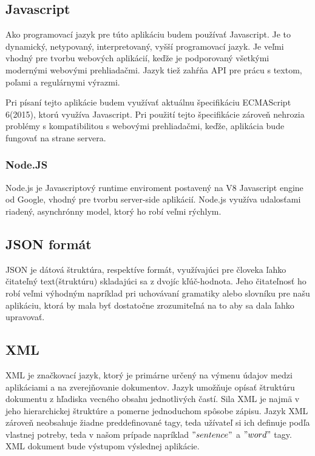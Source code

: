 \documentclass[12pt,a4paper]{report}
\theoremstyle{definition}
\theoremstyle{remark}
\begin{document}
\subsection{Javascript}
Ako programovací jazyk pre túto aplikáciu budem používať Javascript. Je to dynamický, netypovaný, interpretovaný, vyšší programovací jazyk. Je veľmi vhodný pre tvorbu webových aplikácií, keďže je podporovaný všetkými modernými webovými prehliadačmi. Jazyk tiež zahŕňa API pre prácu s textom, poľami a regulárnymi výrazmi.

Pri písaní tejto aplikácie budem využívať aktuálnu špecifikáciu ECMAScript 6(2015), ktorú využíva Javascript. Pri použití tejto špecifikácie zároveň nehrozia problémy s kompatibilitou s webovými prehliadačmi, keďže, aplikácia bude fungovať na strane servera.\cite{js}

\subsubsection{Node.JS}
Node.js je Javascriptový runtime enviroment postavený na V8 Javascript engine od Google, vhodný pre tvorbu server-side aplikácií. Node.js využíva udalosťami riadený, asynchrónny model, ktorý ho robí veľmi rýchlym.


\subsection{JSON formát}
JSON je dátová štruktúra, respektíve formát, využívajúci pre človeka ľahko čitateľný text(štruktúru) skladajúci sa z dvojíc kľúč-hodnota. Jeho čitateľnosť ho robí veľmi výhodným napríklad pri uchovávaní gramatiky alebo slovníku pre našu aplikáciu, ktorá by mala byť dostatočne zrozumiteľná na to aby sa dala ľahko upravovať.


\subsection{XML}
XML je značkovací jazyk, ktorý je primárne určený na výmenu údajov medzi aplikáciami a na zverejňovanie dokumentov. Jazyk umožňuje opísať štruktúru dokumentu z hľadiska vecného obsahu jednotlivých častí. Sila XML je najmä v jeho hierarchickej štruktúre a pomerne jednoduchom spôsobe zápisu. Jazyk XML zároveň neobsahuje žiadne preddefinované tagy, teda užívateľ si ich definuje podľa vlastnej potreby, teda v našom prípade napríklad $"sentence"$ a $"word"$ tagy. XML dokument bude výstupom výslednej aplikácie.

\end{document}
